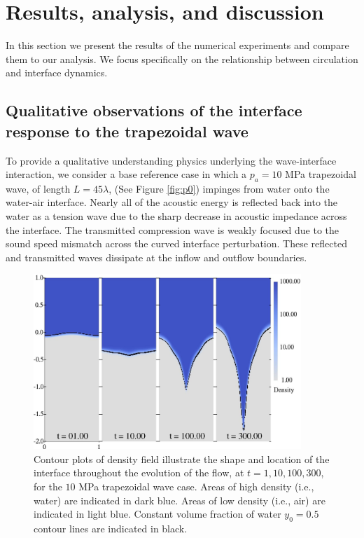 \section{Results, analysis, and discussion}%
\label{sec:results}%
% 
In this section we present the results of the numerical experiments
and compare them to our analysis. We focus specifically on the
relationship between circulation and interface dynamics.
% 
% 
\subsection{Qualitative observations of the interface response to the trapezoidal wave}
\label{subsec:Qualitative}
To provide a qualitative understanding physics underlying the
wave-interface interaction, we consider a base reference case in which
a $p_a=10$ MPa trapezoidal wave, of length $L=45\lambda$, (See Figure
\ref{fig:p0}) impinges from water onto the water-air interface. Nearly
all of the acoustic energy is reflected back into the water as a
tension wave due to the sharp decrease in acoustic impedance across
the interface. The transmitted compression wave is weakly focused due
to the sound speed mismatch across the curved interface
perturbation. These reflected and transmitted waves dissipate at the
inflow and outflow boundaries.
% 
\begin{figure}[h] 
  \centering
  \includegraphics[width=0.9\textwidth]{./figs/lung_figs/snapshots_density_t1}
  \caption[The evolution of the acoustically perturbed interface]
  {Contour plots of density field illustrate the shape and location of
    the interface throughout the evolution of the flow, at
    $t=1, 10, 100, 300$, for the $10$ MPa trapezoidal wave case. Areas
    of high density (i.e., water) are indicated in dark blue. Areas of
    low density (i.e., air) are indicated in light blue. Constant volume
    fraction of water $y_0 = 0.5$ contour lines are indicated in black.}
  \label{fig:interface_snapshots}
\end{figure}
